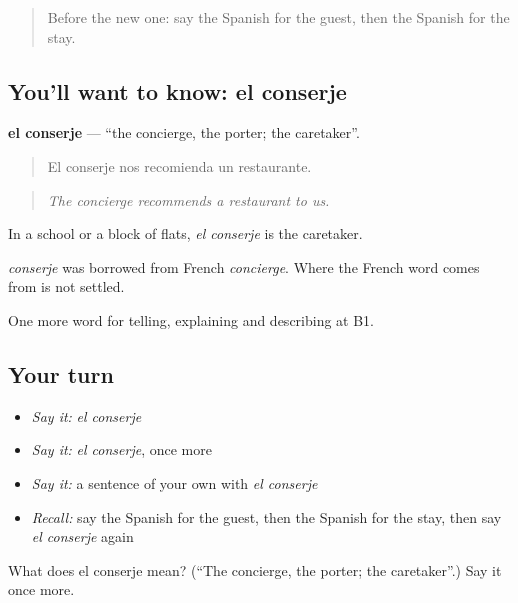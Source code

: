 \label{lesson:ES-C661-conserje}



\begin{quote}
Before the new one: say the Spanish for the guest, then the Spanish for the stay.
\end{quote}

\subsection*{You'll want to know: el conserje}
\textbf{el conserje} — \textquotedblleft{}the concierge, the porter; the caretaker\textquotedblright{}.

\begin{quote}
El conserje nos recomienda un restaurante.
\end{quote}

\begin{quote}
\emph{The concierge recommends a restaurant to us.}
\end{quote}

In a school or a block of flats, \emph{el conserje} is the caretaker.

\begin{cousinweb}
\emph{conserje} was borrowed from French \emph{concierge}. Where the French word comes from is not settled.
\end{cousinweb}

\begin{grammarlens}[title={What you've built}]
One more word for telling, explaining and describing at B1.
\end{grammarlens}

\subsection*{Your turn}
\begin{itemize}
\raggedright
  \item \emph{Say it:} \emph{el conserje}
  \item \emph{Say it:} \emph{el conserje}, once more
  \item \emph{Say it:} a sentence of your own with \emph{el conserje}
  \item \emph{Recall:} say the Spanish for the guest, then the Spanish for the stay, then say \emph{el conserje} again
\end{itemize}

\begin{tcolorbox}[breakable,colback=teal!4,colframe=teal!35!black,title={Before you move on}]
What does el conserje mean? (\textquotedblleft{}The concierge, the porter; the caretaker\textquotedblright{}.) Say it once more.
\end{tcolorbox}
